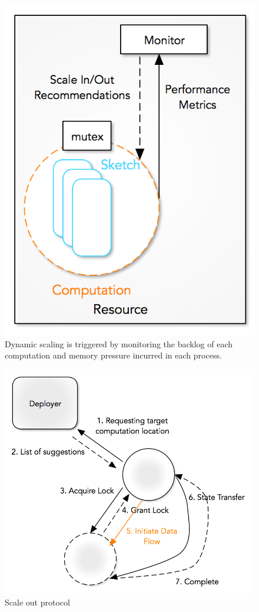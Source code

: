 \begin{figure}
    \centerline{\includegraphics[scale=0.55]{figures/process-monitor.png}}
    \caption{Dynamic scaling is triggered by monitoring the backlog of each computation and memory pressure incurred in each process.}
    \label{fig:process-monitor}
\end{figure}
%
\begin{figure}
    \centerline{\includegraphics[scale=0.55]{figures/scale-out-protocol.png}}
    \caption{Scale out protocol}
    \label{fig:scale-out-protocol}
\end{figure}
%
